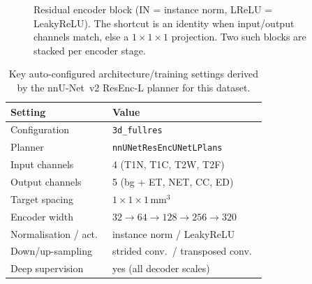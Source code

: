 \documentclass[11pt,a4paper]{article}
\begin{document}
\begin{figure}[h]
\centering
{}
\caption{Residual encoder block (IN = instance norm, LReLU = LeakyReLU). The
shortcut is an identity when input/output channels match, else a
$1\!\times\!1\!\times\!1$ projection. Two such blocks are stacked per encoder stage.}
\label{fig:resblock}
\end{figure}

\begin{table}[h]
\centering
\caption{Key auto-configured architecture/training settings derived by the
nnU-Net~v2 ResEnc-L planner for this dataset.}
\label{tab:arch}
\begin{tabular}{ll}
\toprule
Setting & Value \\
\midrule
Configuration            & \texttt{3d\_fullres} \\
Planner                  & \texttt{nnUNetResEncUNetLPlans} \\
Input channels           & 4 (T1N, T1C, T2W, T2F) \\
Output channels          & 5 (bg + ET, NET, CC, ED) \\
Target spacing           & $1\times1\times1\,\text{mm}^3$ \\
Encoder width            & $32\!\to\!64\!\to\!128\!\to\!256\!\to\!320$ \\
Normalisation / act.\    & instance norm / LeakyReLU \\
Down/up-sampling         & strided conv.\ / transposed conv.\ \\
Deep supervision         & yes (all decoder scales) \\
\bottomrule
\end{tabular}
\end{table}
\end{document}
